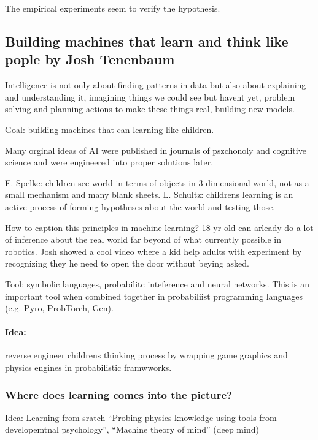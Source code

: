 \documentclass[11pt,oneside,a4paper]{scrartcl}
\begin{document}
The empirical experiments seem to verify the hypothesis.


\subsection{Building machines that learn and think like pople by Josh
  Tenenbaum}
\label{sec:buld-mach-that}

Intelligence is not only about finding patterns in data but also about
explaining and understanding it, imagining things we could see but
havent yet, problem solving and planning actions to make these things
real, building new models.

Goal: building machines that can learning like children.

Many orginal ideas of AI were published in journals of pszchonoly and
cognitive science and were engineered into proper solutions later.

E. Spelke: children see world in terms of objects in 3-dimensional
world, not as a small mechanism and many blank sheets.  L. Schultz:
childrens learning is an active process of forming hypotheses about
the world and testing those.

How to caption this principles in machine learning?
18-yr old can arleady do a lot of inference about the real world far
beyond of what currently possible in robotics. Josh showed a cool
video where a kid help adults with experiment by recognizing they he
need to open the door without beying asked. 

Tool: symbolic languages, probabilitc inteference and neural networks.
This is an important tool when combined together in probabiliist
programming languages (e.g. Pyro, ProbTorch, Gen).

\paragraph{Idea:}
 reverse engineer childrens thinking process by wrapping game
graphics and physics engines in probabilistic framwworks.

\subsubsection*{Where does learning comes into the picture?}

Idea: Learning from sratch ``Probing physics knowledge using tools from
developemtnal psychology'', ``Machine theory of mind'' (deep mind)
\end{document}
